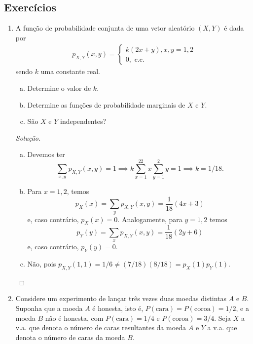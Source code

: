 \documentclass[../Notas.tex]{subfiles}
\begin{document}
\subsection{Exercícios}

\begin{enumerate}
    \item A função de probabilidade conjunta de uma vetor aleatório $(X,Y)$ é dada por
    \begin{align*}
        p_{X,Y}(x,y) = \begin{cases}
            k(2x+y), x,y = 1,2 \\
            0, \text{ c.c.}
        \end{cases}
    \end{align*}
    sendo $k$ uma constante real.
    \begin{enumerate}[a)]
        \item Determine o valor de $k$.
        \item Determine as funções de probabilidade marginais de $X$ e $Y$.
        \item São $X$ e $Y$ independentes?
    \end{enumerate}
    \begin{proof}[Solução]
        \begin{enumerate}[a)]
            \item Devemos ter
            \[
            \sum_{x,y} p_{X,Y}(x,y) = 1 \implies k\sum_{x=1}^22x\sum_{y=1}^2 y = 1
                                        \implies k = 1/18.
            \]
            \item Para $x=1,2$, temos
            \[
            p_X(x) = \sum_y p_{X,Y}(x,y) = \frac{1}{18}(4x+3)
            \]
            e, caso contrário, $p_X(x) = 0$. Analogamente, para $y=1,2$ temos
            \[
            p_Y(y) = \sum_x p_{X,Y}(x,y) = \frac{1}{18}(2y+6)
            \]
            e, caso contrário, $p_Y(y) = 0$.
            \item Não, pois $p_{X,Y}(1,1) = 1/6 \neq (7/18)(8/18) = p_X(1)p_Y(1)$.
        \end{enumerate}
    \end{proof}
    \item Considere um experimento de lançar três vezes duas moedas distintas $A$ e $B$. Suponha que a moeda $A$ é honesta, isto é, $P(\text{cara}) = P(\text{coroa}) = 1/2$, e a moeda $B$ não é honesta, com $P(\text{cara}) = 1/4$ e $P(\text{coroa}) = 3/4$. Seja $X$ a v.a. que denota o número de caras resultantes da moeda $A$ e $Y$ a v.a. que denota o número de caras da moeda $B$.

\end{enumerate}
\end{document}
